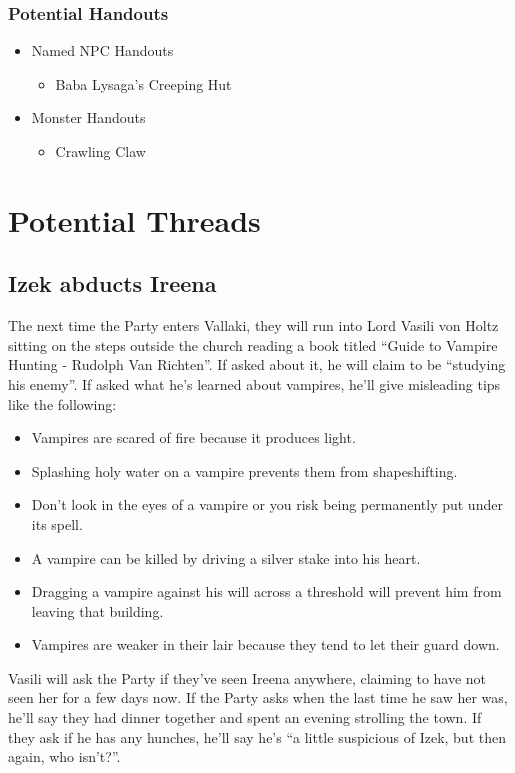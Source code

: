 \documentclass[a4paper,11pt]{article}
\begin{document}
\subsubsection{Potential Handouts}
\begin{itemize}
  \item Named NPC Handouts
  \begin{itemize}
    \item Baba Lysaga's Creeping Hut
  \end{itemize}
  \item Monster Handouts
  \begin{itemize}
    \item Crawling Claw
  \end{itemize}
\end{itemize}

\section{Potential Threads}
\label{sec:PotentialThreads}

\subsection{Izek abducts Ireena}
The next time the Party enters Vallaki, they will run into Lord Vasili von Holtz sitting on the steps outside the church reading a book titled ``Guide to Vampire Hunting - Rudolph Van Richten''. If asked about it, he will claim to be ``studying his enemy''. If asked what he's learned about vampires, he'll give misleading tips like the following:
\begin{itemize}
  \item Vampires are scared of fire because it produces light.
  \item Splashing holy water on a vampire prevents them from shapeshifting.
  \item Don't look in the eyes of a vampire or you risk being permanently put under its spell.
  \item A vampire can be killed by driving a silver stake into his heart.
  \item Dragging a vampire against his will across a threshold will prevent him from leaving that building.
  \item Vampires are weaker in their lair because they tend to let their guard down.
\end{itemize}
Vasili will ask the Party if they've seen Ireena anywhere, claiming to have not seen her for a few days now. If 
the Party asks when the last time he saw her was, he'll say they had dinner together and spent an evening 
strolling the town. If they ask if he has any hunches, he'll say he's ``a little suspicious of Izek, but then 
again, who isn't?''.
\end{document}

